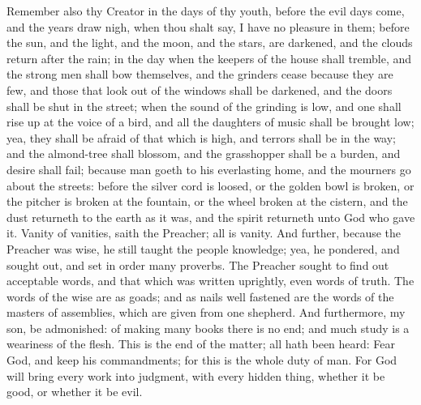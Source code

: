 Remember also thy Creator in the days of thy youth, before the evil days come, and the years draw nigh, when thou shalt say, I have no pleasure in them; before the sun, and the light, and the moon, and the stars, are darkened, and the clouds return after the rain; in the day when the keepers of the house shall tremble, and the strong men shall bow themselves, and the grinders cease because they are few, and those that look out of the windows shall be darkened, and the doors shall be shut in the street; when the sound of the grinding is low, and one shall rise up at the voice of a bird, and all the daughters of music shall be brought low; yea, they shall be afraid of that which is high, and terrors shall be in the way; and the almond-tree shall blossom, and the grasshopper shall be a burden, and desire shall fail; because man goeth to his everlasting home, and the mourners go about the streets: before the silver cord is loosed, or the golden bowl is broken, or the pitcher is broken at the fountain, or the wheel broken at the cistern, and the dust returneth to the earth as it was, and the spirit returneth unto God who gave it. Vanity of vanities, saith the Preacher; all is vanity.  And further, because the Preacher was wise, he still taught the people knowledge; yea, he pondered, and sought out, and set in order many proverbs. The Preacher sought to find out acceptable words, and that which was written uprightly, even words of truth.  The words of the wise are as goads; and as nails well fastened are the words of the masters of assemblies, which are given from one shepherd. And furthermore, my son, be admonished: of making many books there is no end; and much study is a weariness of the flesh.  This is the end of the matter; all hath been heard: Fear God, and keep his commandments; for this is the whole duty of man. For God will bring every work into judgment, with every hidden thing, whether it be good, or whether it be evil. 